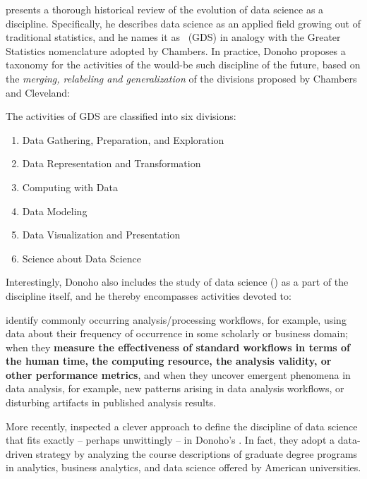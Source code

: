  presents a thorough historical review of the evolution of data science as a discipline.
Specifically, he describes data science as an applied field growing out of traditional statistics, and he names it as \mbox{ (GDS)} in analogy with the Greater Statistics nomenclature adopted by Chambers.
In practice, Donoho proposes a taxonomy for the activities of the would-be such discipline of the future, based on the \textit{merging, relabeling and generalization} of the divisions proposed by Chambers and Cleveland:
\begin{displayquote}
The activities of GDS are classified into six divisions:
\begin{enumerate}
    \item Data Gathering, Preparation, and Exploration\itemsep=1mm
    \item Data Representation and Transformation
    \item Computing with Data
    \item Data Modeling
    \item Data Visualization and Presentation
    \item Science about Data Science \label{gds6}
\end{enumerate}
\end{displayquote}
Interestingly, Donoho also includes the study of data science (\gdsSix) as a part of the discipline itself, and he thereby encompasses activities devoted to:
\begin{displayquote}
identify commonly occurring analysis/processing workflows, for example, using data about their frequency of occurrence in some scholarly or business domain; when they \textbf{measure the effectiveness of standard workflows in terms of the human time, the computing resource, the analysis validity, or other performance metrics}, and when they uncover emergent phenomena in data analysis, for example, new patterns arising in data analysis workflows, or disturbing artifacts in published analysis results.
\end{displayquote}

More recently,  inspected a clever approach to define the discipline of data science that fits exactly -- perhaps unwittingly -- in Donoho's \gdsSix. In fact, they adopt a data-driven strategy by analyzing the course descriptions of graduate degree programs in analytics, business  analytics,  and  data  science  offered  by  American universities.


